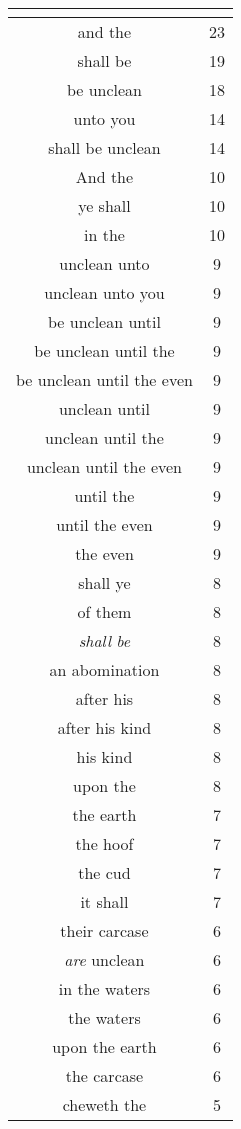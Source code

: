 \begin{center}
\begin{longtable}{|c|c|}
\hline \multicolumn{2}{c}{{ }} \\ \hline
\endfoot 
and the & 23\\ \hline 
shall be & 19\\ \hline 
be unclean & 18\\ \hline 
unto you & 14\\ \hline 
shall be unclean & 14\\ \hline 
And the & 10\\ \hline 
ye shall & 10\\ \hline 
in the & 10\\ \hline 
unclean unto & 9\\ \hline 
unclean unto you & 9\\ \hline 
be unclean until & 9\\ \hline 
be unclean until the & 9\\ \hline 
be unclean until the even & 9\\ \hline 
unclean until & 9\\ \hline 
unclean until the & 9\\ \hline 
unclean until the even & 9\\ \hline 
until the & 9\\ \hline 
until the even & 9\\ \hline 
the even & 9\\ \hline 
shall ye & 8\\ \hline 
of them & 8\\ \hline 
\emph{shall} \emph{be} & 8\\ \hline 
an abomination & 8\\ \hline 
after his & 8\\ \hline 
after his kind & 8\\ \hline 
his kind & 8\\ \hline 
upon the & 8\\ \hline 
the earth & 7\\ \hline 
the hoof & 7\\ \hline 
the cud & 7\\ \hline 
it shall & 7\\ \hline 
their carcase & 6\\ \hline 
\emph{are} unclean & 6\\ \hline 
in the waters & 6\\ \hline 
the waters & 6\\ \hline 
upon the earth & 6\\ \hline 
the carcase & 6\\ \hline 
cheweth the & 5\\ \hline 

\end{longtable}
\end{center}
